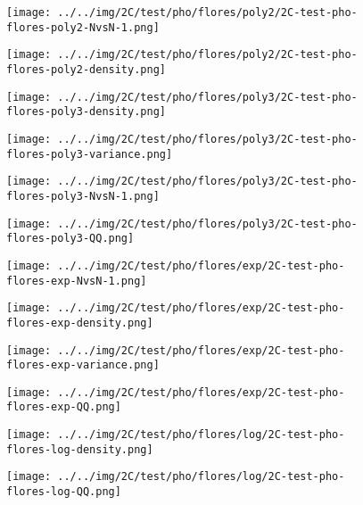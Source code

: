 \begin{figure}[H]
\centering	\texttt{[image: ../../img/2C/test/pho/flores/poly2/2C-test-pho-flores-poly2-NvsN-1.png]}
\end{figure}
\begin{figure}[H]
\centering	\texttt{[image: ../../img/2C/test/pho/flores/poly2/2C-test-pho-flores-poly2-density.png]}
\end{figure}
\begin{figure}[H]
\centering	\texttt{[image: ../../img/2C/test/pho/flores/poly3/2C-test-pho-flores-poly3-density.png]}
\end{figure}
\begin{figure}[H]
\centering	\texttt{[image: ../../img/2C/test/pho/flores/poly3/2C-test-pho-flores-poly3-variance.png]}
\end{figure}
\begin{figure}[H]
\centering	\texttt{[image: ../../img/2C/test/pho/flores/poly3/2C-test-pho-flores-poly3-NvsN-1.png]}
\end{figure}
\begin{figure}[H]
\centering	\texttt{[image: ../../img/2C/test/pho/flores/poly3/2C-test-pho-flores-poly3-QQ.png]}
\end{figure}
\begin{figure}[H]
\centering	\texttt{[image: ../../img/2C/test/pho/flores/exp/2C-test-pho-flores-exp-NvsN-1.png]}
\end{figure}
\begin{figure}[H]
\centering	\texttt{[image: ../../img/2C/test/pho/flores/exp/2C-test-pho-flores-exp-density.png]}
\end{figure}
\begin{figure}[H]
\centering	\texttt{[image: ../../img/2C/test/pho/flores/exp/2C-test-pho-flores-exp-variance.png]}
\end{figure}
\begin{figure}[H]
\centering	\texttt{[image: ../../img/2C/test/pho/flores/exp/2C-test-pho-flores-exp-QQ.png]}
\end{figure}
\begin{figure}[H]
\centering	\texttt{[image: ../../img/2C/test/pho/flores/log/2C-test-pho-flores-log-density.png]}
\end{figure}
\begin{figure}[H]
\centering	\texttt{[image: ../../img/2C/test/pho/flores/log/2C-test-pho-flores-log-QQ.png]}
\end{figure}

